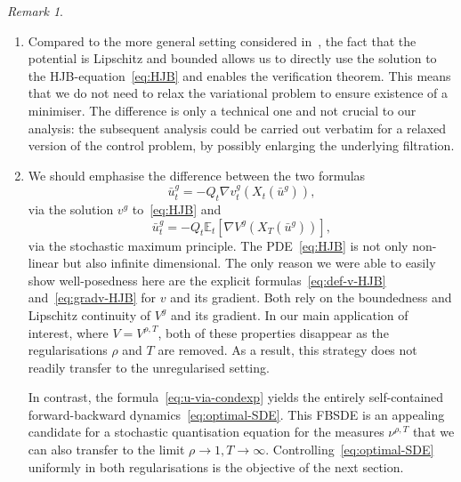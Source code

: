 \documentclass[11pt, a4paper]{scrartcl}
\numberwithin{equation}{section}
\theoremstyle{plain}
\theoremstyle{remark}
\newtheorem{remark}[foo]{Remark}
\newcommand{\tmdummy}{$\mbox{}$}
\newenvironment{enumeratealpha}{\begin{enumerate}[a{\textup{)}}] }{\end{enumerate}}
\begin{document}
\begin{remark}
  \label{rem:ctrl-prob}{\tmdummy}
  \begin{enumeratealpha}
    \item Compared to the more general setting considered
    in~{\cite{barashkovVariationalMethodEuclidean2023}}, the fact that the
    potential is Lipschitz and bounded allows us to directly use the solution
    to the HJB-equation~\eqref{eq:HJB} and enables the verification theorem.
    This means that we do not need to relax the variational problem to ensure
    existence of a minimiser. The difference is only a technical one and not
    crucial to our analysis: the subsequent analysis could be carried out
    verbatim for a relaxed version of the control problem, by possibly
    enlarging the underlying filtration.
    
    \item \label{rem:HJB-vs-condexp}We should emphasise the difference between
    the two formulas
    \begin{equation}
      \bar{u}^g_t = - Q_t \nabla v^g_t (X_t (\bar{u}^g)),
      \label{eq:u-via-HJB-2}
    \end{equation}
    via the solution $v^g$ to~\eqref{eq:HJB} and
    \begin{equation}
      \bar{u}^g_t = - Q_t \mathbb{E}_t [\nabla V^g (X_T (\bar{u}^g))],
      \label{eq:u-via-condexp}
    \end{equation}
    via the stochastic maximum principle. The PDE~\eqref{eq:HJB} is not only
    non-linear but also infinite dimensional. The only reason we were able to
    easily show well-posedness here are the explicit
    formulas~\eqref{eq:def-v-HJB} and~\eqref{eq:gradv-HJB} for $v$ and its
    gradient. Both rely on the boundedness and Lipschitz continuity of $V^g$
    and its gradient. In our main application of interest, where $V = V^{\rho,
    T}$, both of these properties disappear as the regularisations $\rho$ and
    $T$ are removed. As a result, this strategy does not readily transfer to
    the unregularised setting.
    
    In contrast, the formula~\eqref{eq:u-via-condexp} yields the entirely
    self-contained forward-backward dynamics~\eqref{eq:optimal-SDE}. This
    FBSDE is an appealing candidate for a stochastic quantisation equation for
    the measures $\nu^{\rho, T}$ that we can also transfer to the limit $\rho
    \rightarrow 1, T \rightarrow \infty$. Controlling~\eqref{eq:optimal-SDE}
    uniformly in both regularisations is the objective of the next section.
  \end{enumeratealpha}
\end{remark}
\end{document}
